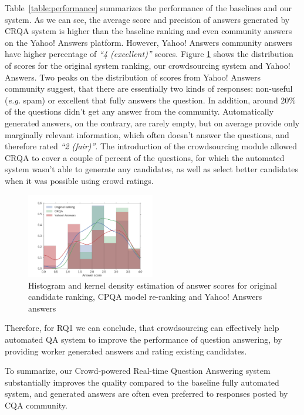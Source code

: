 Table~\ref{table:performance} summarizes the performance of the baselines and our system.
As we can see, the average score and precision of answers generated by CRQA system is higher than the baseline ranking and even community answers on the Yahoo! Answers platform.
However, Yahoo! Answers community answers have higher percentage of \textit{``4 (excellent)''} scores.
Figure \ref{fig:score_histogram} shows the distribution of scores for the original system ranking, our crowdsourcing system and Yahoo! Answers.
Two peaks on the distribution of scores from Yahoo! Answers community suggest, that there are essentially two kinds of responses: non-useful (\textit{e.g.} spam) or excellent that fully answers the question.
In addition, around 20\% of the questions didn't get any answer from the community.
Automatically generated answers, on the contrary, are rarely empty, but on average provide only marginally relevant information, which often doesn't answer the questions, and therefore rated \textit{``2 (fair)''}.
The introduction of the crowdsourcing module allowed CRQA to cover a couple of percent of the questions, for which the automated system wasn't able to generate any candidates, as well as select better candidates when it was possible using crowd ratings.

\begin{figure}[h]
	\centering
	\includegraphics[width=0.5\textwidth]{img/score_hist}
	\caption{Histogram and kernel density estimation of answer scores for original candidate ranking, CPQA model re-ranking and Yahoo! Answers answers}
	\label{fig:score_histogram}
\end{figure}

Therefore, for RQ1 we can conclude, that crowdsourcing can effectively help automated QA system to improve the performance of question answering, by providing worker generated answers and rating existing candidates.

To summarize, our Crowd-powered Real-time Question Answering system substantially improves the quality compared to the baseline fully automated system, and generated answers are often even preferred to responses posted by CQA community.